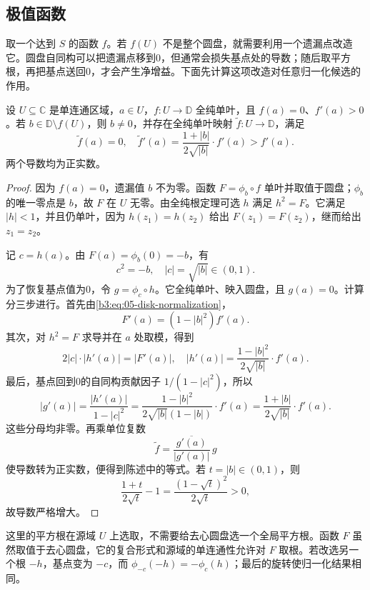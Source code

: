 \subsection{极值函数}
\label{b3:subsec:050203}

取一个达到 \(S\) 的函数 \(f\)。若 \(f(U)\) 不是整个圆盘，就需要利用一个遗漏点改造它。圆盘自同构可以把遗漏点移到0，但通常会损失基点处的导数；随后取平方根，再把基点送回0，才会产生净增益。下面先计算这项改造对任意归一化候选的作用。

\begin{proposition}[遗漏值改进]\label{b3:prop:05-omitted-value-improvement}
设 \(U\subseteq\mathbb C\) 是单连通区域，\(a\in U\)，\(f:U\to\mathbb D\) 全纯单叶，且 \(f(a)=0\)、\(f'(a)>0\)。若 \(b\in\mathbb D\setminus f(U)\)，则 \(b\ne0\)，并存在全纯单叶映射 \(\widetilde f:U\to\mathbb D\)，满足
\[
 \widetilde f(a)=0,\quad
 \widetilde f'(a)
 =\frac{1+|b|}{2\sqrt{|b|}}\cdot f'(a)>f'(a).
\]
两个导数均为正实数。
\end{proposition}
\begin{proof}
因为 \(f(a)=0\)，遗漏值 \(b\) 不为零。函数 \(F=\phi_b\circ f\) 单叶并取值于圆盘；\(\phi_b\) 的唯一零点是 \(b\)，故 \(F\) 在 \(U\) 无零。由全纯根定理可选 \(h\) 满足 \(h^2=F\)。它满足 \(|h|<1\)，并且仍单叶，因为 \(h(z_1)=h(z_2)\) 给出 \(F(z_1)=F(z_2)\)，继而给出 \(z_1=z_2\)。

记 \(c=h(a)\)。由 \(F(a)=\phi_b(0)=-b\)，有
\[
 c^2=-b,\quad |c|=\sqrt{|b|}\in(0,1).
\]
为了恢复基点值为0，令 \(g=\phi_c\circ h\)。它全纯单叶、映入圆盘，且 \(g(a)=0\)。计算分三步进行。首先由\eqref{b3:eq:05-disk-normalization}，
\[
 F'(a)=(1-|b|^2)f'(a).
\]
其次，对 \(h^2=F\) 求导并在 \(a\) 处取模，得到
\[
 2|c|\cdot|h'(a)|=|F'(a)|,
 \quad
 |h'(a)|=\frac{1-|b|^2}{2\sqrt{|b|}}\cdot f'(a).
\]
最后，基点回到0的自同构贡献因子 \(1/(1-|c|^2)\)，所以
\begin{equation}\label{b3:eq:05-root-gain}
 |g'(a)|=\frac{|h'(a)|}{1-|c|^2}
 =\frac{1-|b|^2}{2\sqrt{|b|}(1-|b|)}\cdot f'(a)
 =\frac{1+|b|}{2\sqrt{|b|}}\cdot f'(a).
\end{equation}
这些分母均非零。再乘单位复数
\[
 \widetilde f=\frac{\overline{g'(a)}}{|g'(a)|}\,g
\]
使导数转为正实数，便得到陈述中的等式。若 \(t=|b|\in(0,1)\)，则
\[
 \frac{1+t}{2\sqrt t}-1
 =\frac{(1-\sqrt t)^2}{2\sqrt t}>0,
\]
故导数严格增大。
\end{proof}

这里的平方根在源域 \(U\) 上选取，不需要给去心圆盘选一个全局平方根。函数 \(F\) 虽然取值于去心圆盘，它的复合形式和源域的单连通性允许对 \(F\) 取根。若改选另一个根 \(-h\)，基点变为 \(-c\)，而 \(\phi_{-c}(-h)=-\phi_c(h)\)；最后的旋转使归一化结果相同。

